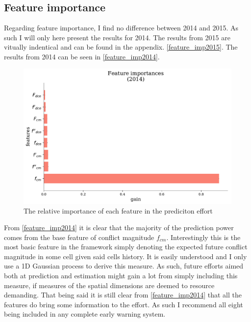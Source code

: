 \documentclass[a4paper]{article}
\begin{document}

\subsection{Feature importance}

Regarding feature importance, I find no difference between 2014 and 2015. As such I will only here present the results for 2014. The results from 2015 are vitually indentical and can be found in the appendix. \autoref{feature_imp2015}. The results from 2014 can be seen in \autoref{feature_imp2014}.\par 

\begin{figure}[!htb]
 	\centering
	\includegraphics[scale=0.47]{feature_imp_2014.pdf}
  \caption{\footnotesize{The relative importance of each feature in the prediciton effort}}\label{feature_imp2014}
\end{figure}

From \autoref{feature_imp2014} it is clear that the majority of the prediction power comes from the base feature of conflict magnitude $f_{cm}$. Interestingly this is the most basic feature in the framework simply denoting the expected future conflict magnitude in some cell given said cells history. It is easily understood and I only use a 1D Gaussian process to derive this measure. As such, future efforts aimed both at prediction and estimation might gain a lot from simply including this measure, if measures of the spatial dimensions are deemed to resource demanding. That being said it is still clear from \autoref{feature_imp2014} that all the features do bring some information to the effort. As such I recommend all eight being included in any complete early warning system.\par
\end{document}
